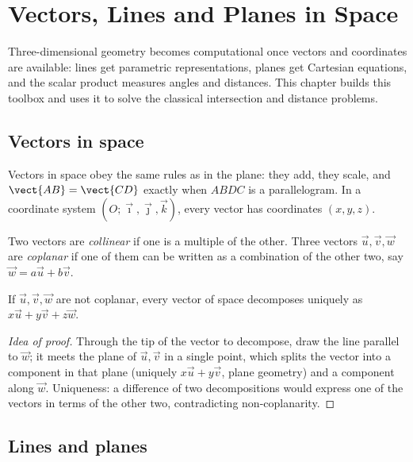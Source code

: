 \chapter{Vectors, Lines and Planes in Space}\label{ch:tle:space}

Three-dimensional geometry becomes computational once vectors and
coordinates are available: lines get parametric representations, planes get
Cartesian equations, and the scalar product measures angles and distances.
This chapter builds this toolbox and uses it to solve the classical
intersection and distance problems.

\section{Vectors in space}

Vectors in space obey the same rules as in the plane: they add, they scale,
and $\vect{AB} = \vect{CD}$ exactly when $ABDC$ is a parallelogram. In a
coordinate system $(O; \vec\imath, \vec\jmath, \vec k)$, every vector has
coordinates $(x, y, z)$.

\begin{definition}\label{def:tle:space:collinear}
Two vectors are \emph{collinear} if one is a multiple of the other. Three
vectors $\vec u, \vec v, \vec w$ are \emph{coplanar} if one
of them can be written as a combination of the other two, say
$\vec w = a\vec u + b\vec v$.
\end{definition}

\begin{proposition}\label{prop:tle:space:basis}
If $\vec u, \vec v, \vec w$ are not coplanar, every vector of space
decomposes uniquely as $x\vec u + y\vec v + z\vec w$.
\end{proposition}

\begin{proof}[Idea of proof]
Through the tip of the vector to decompose, draw the line parallel to
$\vec w$; it meets the plane of $\vec u, \vec v$ in a single point, which
splits the vector into a component in that plane (uniquely $x\vec u + y\vec
v$, plane geometry) and a component along $\vec w$. Uniqueness: a difference
of two decompositions would express one of the vectors in terms of the other
two, contradicting non-coplanarity.
\end{proof}

\section{Lines and planes}

